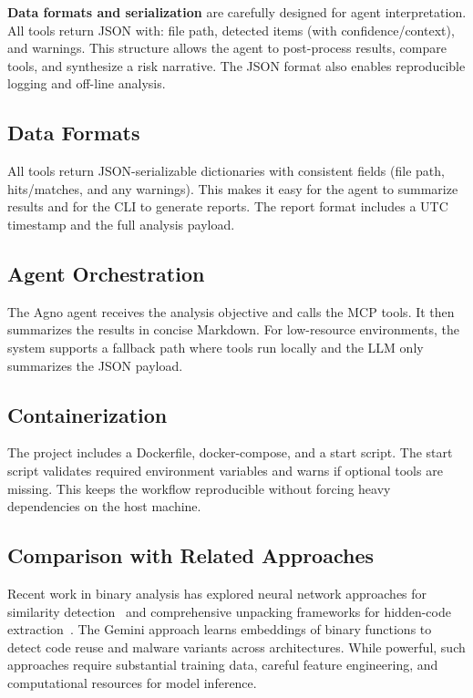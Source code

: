 \documentclass[11pt]{article}
\begin{document}
\textbf{Data formats and serialization} are carefully designed for agent interpretation. All tools return JSON with: file path, detected items (with confidence/context), and warnings. This structure allows the agent to post-process results, compare tools, and synthesize a risk narrative. The JSON format also enables reproducible logging and off-line analysis.

\subsection{Data Formats}
All tools return JSON-serializable dictionaries with consistent fields (file path, hits/matches, and any warnings). This makes it easy for the agent to summarize results and for the CLI to generate reports. The report format includes a UTC timestamp and the full analysis payload.

\subsection{Agent Orchestration}
The Agno agent receives the analysis objective and calls the MCP tools. It then summarizes the results in concise Markdown. For low-resource environments, the system supports a fallback path where tools run locally and the LLM only summarizes the JSON payload.

\subsection{Containerization}
The project includes a Dockerfile, docker-compose, and a start script. The start script validates required environment variables and warns if optional tools are missing. This keeps the workflow reproducible without forcing heavy dependencies on the host machine.

\subsection{Comparison with Related Approaches}
Recent work in binary analysis has explored neural network approaches for similarity detection~\cite{gemini2018} and comprehensive unpacking frameworks for hidden-code extraction~\cite{polyunpack2007}. The Gemini approach learns embeddings of binary functions to detect code reuse and malware variants across architectures. While powerful, such approaches require substantial training data, careful feature engineering, and computational resources for model inference.
\end{document}
